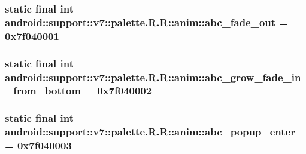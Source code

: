 \hypertarget{classandroid_1_1support_1_1v7_1_1palette_1_1_r_1_1anim_0929d7a2be865b9d7362457945b9657f}{
\subsubsection[{abc\_\-fade\_\-out}]{\setlength{\rightskip}{0pt plus 5cm}static final int android::support::v7::palette.R.R::anim::abc\_\-fade\_\-out = 0x7f040001}}
\label{classandroid_1_1support_1_1v7_1_1palette_1_1_r_1_1anim_0929d7a2be865b9d7362457945b9657f}


\hypertarget{classandroid_1_1support_1_1v7_1_1palette_1_1_r_1_1anim_1f8bde8b2f08f2f2f7d178725f722977}{
\subsubsection[{abc\_\-grow\_\-fade\_\-in\_\-from\_\-bottom}]{\setlength{\rightskip}{0pt plus 5cm}static final int android::support::v7::palette.R.R::anim::abc\_\-grow\_\-fade\_\-in\_\-from\_\-bottom = 0x7f040002}}
\label{classandroid_1_1support_1_1v7_1_1palette_1_1_r_1_1anim_1f8bde8b2f08f2f2f7d178725f722977}


\hypertarget{classandroid_1_1support_1_1v7_1_1palette_1_1_r_1_1anim_60c7a37693887d9bb274c050f78a12de}{
\subsubsection[{abc\_\-popup\_\-enter}]{\setlength{\rightskip}{0pt plus 5cm}static final int android::support::v7::palette.R.R::anim::abc\_\-popup\_\-enter = 0x7f040003}}
\label{classandroid_1_1support_1_1v7_1_1palette_1_1_r_1_1anim_60c7a37693887d9bb274c050f78a12de}


